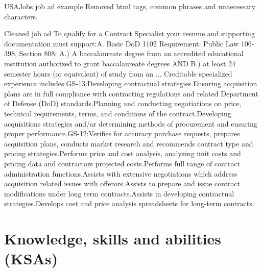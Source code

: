 \documentclass{beamer}
\begin{document}
\begin{frame}{USAJobs job ad example}
  Removed html tags, common phrases and unnecessary characters.
  \scriptsize
  \begin{exampleblock}{Cleaned job ad}
    To qualify for a Contract Specialist your resume and supporting documentation must support:A. Basic DoD 1102 Requirement: Public Law 106-398, Section 808: A.) A baccalaureate degree from an accredited educational institution authorized to grant baccalaureate degrees AND B.) at least 24 semester hours (or equivalent) of study from an ... Creditable specialized experience includes:GS-13:Developing contractual strategies.Ensuring acquisition plans are in full compliance with contracting regulations and related Department of Defense (DoD) standards.Planning and conducting negotiations on price, technical requirements, terms, and conditions of the contract.Developing acquisitions strategies and/or determining methods of procurement and ensuring proper performance.GS-12:Verifies for accuracy purchase requests, prepares acquisition plans, conducts market research and recommends contract type and pricing strategies.Performs price and cost analysis, analyzing unit costs and pricing data and contractors projected costs.Performs full range of contract administration functions.Assists with extensive negotiations which address acquisition related issues with offerors.Assists to prepare and issue contract modifications under long term contracts.Assists in developing contractual strategies.Develops cost and price analysis spreadsheets for long-term contracts.
  \end{exampleblock}
\end{frame}

\section{Knowledge, skills and abilities (KSAs)}
\end{document}
